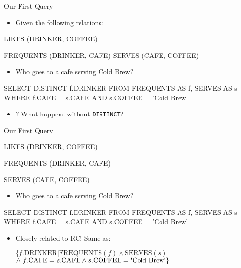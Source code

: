 \documentclass[aspectratio=169]{beamer}
\newenvironment{noindentitemize}
{ \begin{itemize}
 \setlength{\itemsep}{1.5ex}
  \setlength{\parsep}{0pt}   
  \setlength{\parskip}{0pt}
 \addtolength{\leftskip}{-2em}
 }
{ \end{itemize} }
\newcommand{\FREQUENTS}{\textrm{FREQUENTS}}
\newcommand{\SERVES}{\textrm{SERVES}}
\newcommand{\CAFE}{\textrm{CAFE}}
\newcommand{\COFFEE}{\textrm{COFFEE}}
\newcommand{\DRINKER}{\textrm{DRINKER}}
\newcommand{\CB}{\textrm{\textquotesingle{Cold} Brew\textquotesingle}}
\begin{document}
\begin{frame}[fragile]{Our First Query}
\begin{noindentitemize}
\item Given the following relations:
\end{noindentitemize}
	

LIKES (DRINKER, COFFEE)

FREQUENTS (DRINKER, CAFE)
SERVES (CAFE, COFFEE)

\begin{noindentitemize}
\item Who goes to a cafe serving Cold Brew?  %
\end{noindentitemize}

\begin{SQL}
SELECT DISTINCT f.DRINKER
FROM FREQUENTS AS f, SERVES AS s
WHERE f.CAFE = s.CAFE AND s.COFFEE = 'Cold Brew'
\end{SQL}

\begin{noindentitemize}
\item[?] What happens without \texttt{DISTINCT}? %
\end{noindentitemize}
\end{frame}
	
\begin{frame}[fragile]{Our First Query}

LIKES (DRINKER, COFFEE)

FREQUENTS (DRINKER, CAFE)

SERVES (CAFE, COFFEE)

\begin{itemize}
\item Who goes to a cafe serving Cold Brew?  %
\end{itemize}

\begin{SQL}
SELECT DISTINCT f.DRINKER
FROM FREQUENTS AS f, SERVES AS s
WHERE f.CAFE = s.CAFE AND s.COFFEE = 'Cold Brew'
\end{SQL}

\begin{itemize}
\item Closely related to RC!  Same as:
\item[] $\{f.\DRINKER | \FREQUENTS(f) \wedge \SERVES(s) $\\
\hspace{2em}$\wedge\ f.\CAFE = s.\CAFE \wedge s.\COFFEE = 
		\CB\}$
\end{itemize}
\end{frame}
\end{document}
